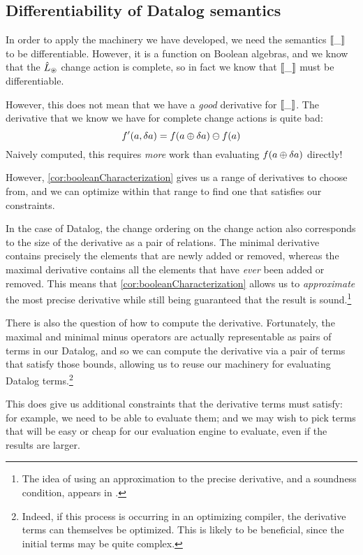 \subsection{Differentiability of Datalog semantics}
\label{sec:datalogDifferentiability}

In order to apply the machinery we have developed, we need the semantics $\llbracket \_ \rrbracket$ to
be differentiable. However, it is a function on Boolean algebras, and we know
that the $\hat{L}_\circledast$ change action is complete, so in fact we know that
$\llbracket \_ \rrbracket$ must be differentiable.

However, this does not mean that we have a \emph{good} derivative for
$\llbracket \_ \rrbracket$. The derivative that we know we have for complete change actions
is quite bad:
$$f'(a, \delta a) = f(a \oplus \delta a) \ominus f(a)$$
Naively computed, this requires \emph{more} work than evaluating $f(a \oplus \delta a)$ directly!

However, \cref{cor:booleanCharacterization} gives us a range of derivatives to
choose from, and we can optimize within that range to find one that satisfies
our constraints.

In the case of Datalog, the change ordering on the change action also
corresponds to the size of the derivative as a pair of relations. The minimal
derivative contains precisely the elements that are newly added or removed,
whereas the maximal derivative contains all the elements that have \emph{ever}
been added or removed. This means that \cref{cor:booleanCharacterization} allows
us to \emph{approximate} the most precise derivative while still being
guaranteed that the result is sound.\footnote{The idea of using an approximation
to the precise derivative, and a soundness condition, appears in \textcite{bancilhon1986amateur}.}

There is also the question of how to compute the derivative. Fortunately, the
maximal and minimal minus operators are actually representable as pairs of terms
in our Datalog, and so we can compute the derivative via a pair of terms that
satisfy those bounds, allowing us to reuse our machinery for evaluating Datalog
terms.\footnote{Indeed, if this process is occurring in an optimizing compiler,
  the derivative terms can themselves be optimized. This is likely to be
  beneficial, since the initial terms may be quite complex.}

This does give us additional constraints that the derivative terms must satisfy:
for example, we need to be able to evaluate them; and we may wish to pick terms that will be easy or cheap
for our evaluation engine to evaluate, even if the results are larger.

